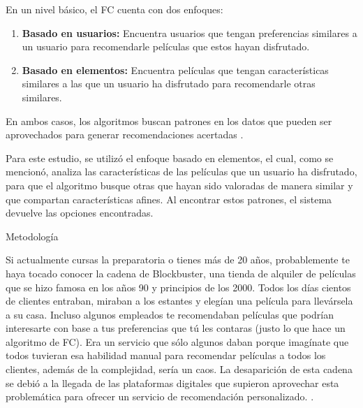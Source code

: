 \documentclass[letterpaper,10pt,final,hyphenatedtitles]{papertexKS}
\begin{document}
\begin{news}{2}
	En un nivel básico, el FC cuenta con dos enfoques:

	\begin{enumerate}
		\item \textbf{Basado en usuarios:} Encuentra usuarios que tengan preferencias similares a un usuario para recomendarle películas que estos hayan disfrutado.
		\item \textbf{Basado en elementos:} Encuentra películas que tengan características similares a las que un usuario ha disfrutado para recomendarle otras similares.
	\end{enumerate}
	
    En ambos casos, los algoritmos buscan patrones en los datos que pueden ser aprovechados para generar recomendaciones acertadas \cite{papadakis2022collaborative}. 

	Para este estudio, se utilizó el enfoque basado en elementos, el cual, como se mencionó, analiza las características de las películas que un usuario ha disfrutado, para que el algoritmo busque otras que hayan sido valoradas de manera similar y que compartan características afines. Al encontrar estos patrones, el sistema devuelve las opciones encontradas.


	\noindent\textcolor{color}{\Large{Metodología}}

	Si actualmente cursas la preparatoria o tienes más de 20 años, probablemente te haya tocado conocer la cadena de Blockbuster, una tienda de alquiler de películas que se hizo famosa en los años 90 y principios de los 2000. Todos los días cientos de clientes entraban, miraban a los estantes y elegían una película para llevársela a su casa. Incluso algunos empleados te recomendaban películas que podrían interesarte con base a tus preferencias que tú les contaras (justo lo que hace un algoritmo de FC). Era un servicio que sólo algunos daban porque imagínate que todos tuvieran esa habilidad manual para recomendar películas a todos los clientes, además de la complejidad, sería un caos. La desaparición de esta cadena se debió a la llegada de las plataformas digitales que supieron aprovechar esta problemática para ofrecer un servicio de recomendación personalizado. \cite{davis2013blockbuster}.


\end{news}
\end{document}

